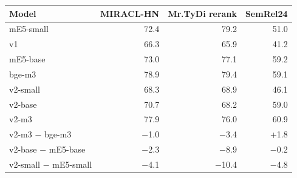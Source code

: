 \begin{tabular}{@{}lrrr@{}}
\toprule
Model & MIRACL-HN & Mr.TyDi rerank & SemRel24 \\
\midrule
mE5-small & 72.4 & 79.2 & 51.0 \\
v1 & 66.3 & 65.9 & 41.2 \\
mE5-base & 73.0 & 77.1 & 59.2 \\
bge-m3 & 78.9 & 79.4 & 59.1 \\
v2-small & 68.3 & 68.9 & 46.1 \\
v2-base & 70.7 & 68.2 & 59.0 \\
v2-m3 & 77.9 & 76.0 & 60.9 \\
\midrule
v2-m3 $-$ bge-m3 & $-$1.0 & $-$3.4 & +1.8 \\
v2-base $-$ mE5-base & $-$2.3 & $-$8.9 & $-$0.2 \\
v2-small $-$ mE5-small & $-$4.1 & $-$10.4 & $-$4.8 \\
\bottomrule
\end{tabular}

